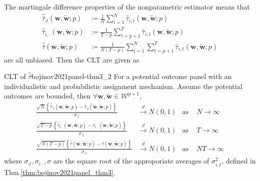 \documentclass[twoside]{article}
\begin{document}
The martingale difference properties of the nonparametric estimator means that
\begin{align*}
    \hat{\bar{\tau}}_{\cdot t}\left(\mathbf{w},\tilde{\mathbf{w}};p\right) &\coloneq \frac{1}{N}\sum^N_{i=1}\hat{\tau}_{i,t}\left(\mathbf{w},\tilde{\mathbf{w}};p\right) \\
    \hat{\bar{\tau}}_{i,\cdot}\left(\mathbf{w},\tilde{\mathbf{w}};p\right) &\coloneq \frac{1}{T-p}\sum^T_{t=p+1}\hat{\tau}_{i,t}\left(\mathbf{w},\tilde{\mathbf{w}};p\right) \\
    \hat{\bar{\tau}}\left(\mathbf{w},\tilde{\mathbf{w}};p\right) &\coloneq \frac{1}{N(T-p)}\sum^N_{i=1}\sum^T_{t=p+1}\hat{\tau}_{i,t}\left(\mathbf{w},\tilde{\mathbf{w}};p\right)
\end{align*}
are all unbiased. Then the CLT are given as 
\begin{theorem}{CLT of $\hat{\bar{\tau}}$}{bojinov2021panel-thm3_2}
    For a potential outcome panel with an individualistic and probabilistic assignment mechanism. Assume the potential outcomes are bounded, then $\forall \mathbf{w},\tilde{\mathbf{w}}\in\mathcal{W}^{p+1}$, 
    \begin{align*}
        \frac{ \sqrt{N}\left\{\hat{\bar{\tau}}_{\cdot t}\left(\mathbf{w},\tilde{\mathbf{w}};p\right) - {\bar{\tau}}_{\cdot t}\left(\mathbf{w},\tilde{\mathbf{w}};p\right) \right\} }{\sigma_{\cdot t}} &\xrightarrow{d} N(0,1) & \text{as }&N\rightarrow \infty \\
        \frac{ \sqrt{T-p}\left\{\hat{\bar{\tau}}_{i\cdot}\left(\mathbf{w},\tilde{\mathbf{w}};p\right) - {\bar{\tau}}_{i\cdot}\left(\mathbf{w},\tilde{\mathbf{w}};p\right) \right\} }{\sigma_{\cdot t}} &\xrightarrow{d} N(0,1) & \text{as }&T\rightarrow \infty \\
        \frac{ \sqrt{N(T-p)}\left\{\hat{\bar{\tau}}\left(\mathbf{w},\tilde{\mathbf{w}};p\right) - {\bar{\tau}}\left(\mathbf{w},\tilde{\mathbf{w}};p\right) \right\} }{\sigma_{\cdot t}} &\xrightarrow{d} N(0,1) & \text{as }&NT\rightarrow \infty 
    \end{align*}
    where $\sigma_{\cdot t},\sigma_{i\cdot},\sigma$ are the square root of the approporiate averages of $\sigma^2_{i,t}$, defined in Thm.\ref{thm:bojinov2021panel_thm3}.
\end{theorem}
\end{document}
